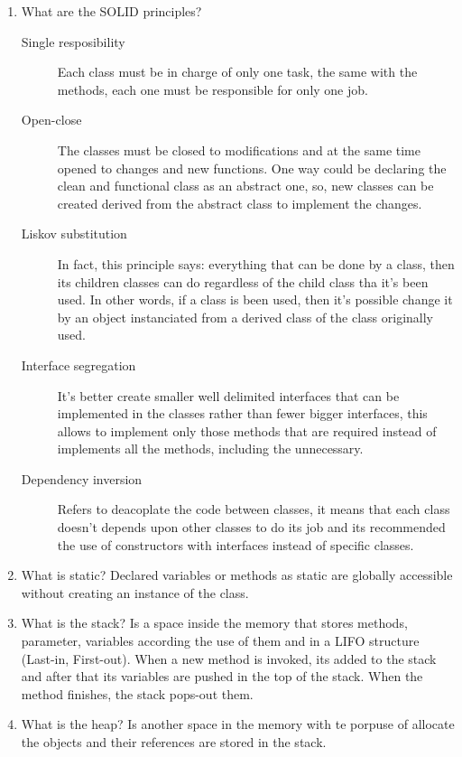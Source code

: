 \begin{multicols}{2}
\begin{enumerate}
\item What are the SOLID principles?
\begin{description}
\item[Single resposibility] Each class must be in charge of only one task, the same with the methods, each one must be responsible for only one job.

\item[Open-close]  The classes must be closed to modifications and at the same time opened to changes and new functions. One way could be declaring the clean and functional class as an abstract one, so, new classes can be created derived from the abstract class to implement the changes.

\item[Liskov substitution] In fact, this principle says: everything that can be done by a class, then its children classes can do regardless of the child class tha it's been used. In other words, if a class is been used, then it's possible change it by an object instanciated from a derived class of the class originally used.

\item[Interface segregation] It's better create smaller well delimited interfaces that can be implemented in the classes rather than fewer bigger interfaces, this allows to implement only those methods that are required instead of implements all the methods, including the unnecessary.

\item[Dependency inversion] Refers to deacoplate the code between classes, it means that each class doesn't depends upon other classes to do its job and its recommended the use of constructors with interfaces instead of specific classes.

\end{description}

\item What is static? Declared variables or methods as static are globally accessible without creating an instance of the class.

\item What is the stack? Is a space inside the memory that stores methods, parameter, variables according the use of them and in a LIFO structure (Last-in, First-out). When a new method is invoked, its added to the stack and after that its variables are pushed in the top of the stack. When the method finishes, the stack pops-out them.

\item What is the heap? Is another space in the memory with te porpuse of allocate the objects and their references are stored in the stack.


\end{enumerate}
\end{multicols}
